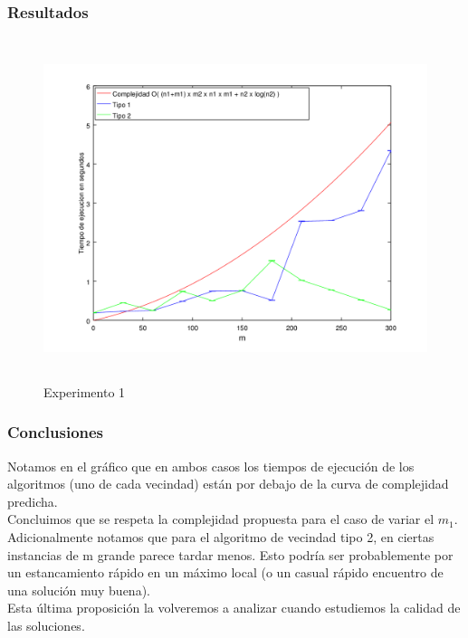 \subsubsection*{Resultados}\;

    \begin{figure}[H]
      \includegraphics[height=10cm]{graficos/ejercicio5-exp1.png}
       \caption{Experimento 1}
	\end{figure}
    
\subsubsection*{Conclusiones}\;
 Notamos en el gráfico que en ambos casos los tiempos de ejecución de los algoritmos (uno de cada vecindad) están por debajo de la curva de complejidad predicha.\\
 Concluimos que se respeta la complejidad propuesta para el caso de variar el $m_1$.\\
 Adicionalmente notamos que para el algoritmo de vecindad tipo 2, en ciertas instancias de m grande parece tardar menos. Esto podría ser probablemente por un estancamiento rápido en un máximo local (o un casual rápido encuentro de una solución muy buena).\\
 Esta última proposición la volveremos a analizar cuando estudiemos la calidad de las soluciones.
        
        

